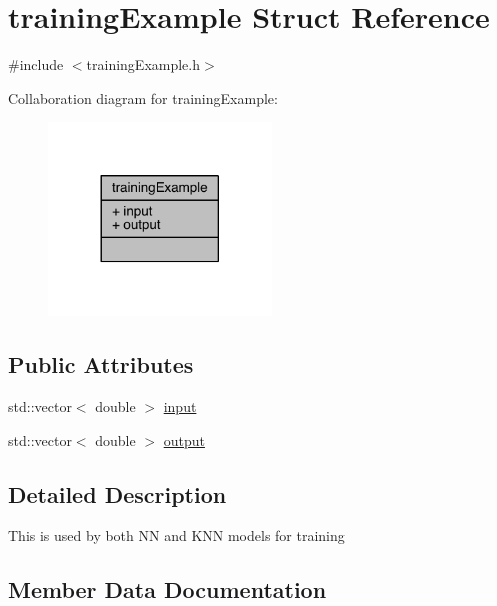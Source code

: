 \hypertarget{structtraining_example}{}\section{training\+Example Struct Reference}
\label{structtraining_example}


{\ttfamily \#include $<$training\+Example.\+h$>$}



Collaboration diagram for training\+Example\+:\nopagebreak
\begin{figure}[H]
\begin{center}
\leavevmode
\includegraphics[width=168pt]{structtraining_example__coll__graph}
\end{center}
\end{figure}
\subsection*{Public Attributes}
\begin{DoxyCompactItemize}
\item 
std\+::vector$<$ double $>$ \hyperlink{structtraining_example_a066378f49152305e496c0f76fb13246d}{input}
\item 
std\+::vector$<$ double $>$ \hyperlink{structtraining_example_ae776963ea692ba5260d4d329f579c9fd}{output}
\end{DoxyCompactItemize}


\subsection{Detailed Description}
This is used by both NN and K\+NN models for training 

\subsection{Member Data Documentation}
\mbox{\label{structtraining_example_a066378f49152305e496c0f76fb13246d}} 
